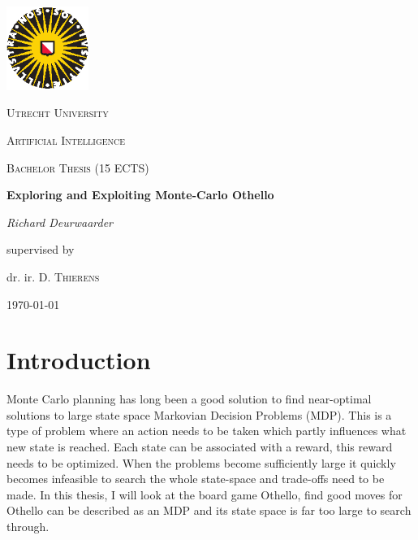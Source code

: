 \documentclass[11pt,a4paper]{article}
\begin{document}
\begin{titlepage}
	\centering
	\includegraphics[width=0.20\textwidth]{images/uu-logo}\par\vspace{1cm}
	{\scshape\LARGE Utrecht University \par}
	\vspace{0.5cm}
	{\scshape\Large Artificial Intelligence\par}
	{\scshape\Large Bachelor Thesis (15 ECTS)\par}
	\vspace{1.5cm}
	{\huge\bfseries Exploring and Exploiting Monte-Carlo Othello\par}
	\vspace{0.5cm}
	{\Large\itshape Richard Deurwaarder\par}
	\vfill
	supervised by\par
	dr. ir. D. \textsc{Thierens}
	
	\vfill
	
	{\large \today\par}
\end{titlepage}

\begin{abstract}
TODO
Monte Carlo planning has long been a good solution to find near optimal solutions to large state space Markovian Decision Problems (MDP). This is a type of problem where an action needs to be taken which partly influences what new state is reached. Each state can be associated with a reward, this reward needs to be optimized. When the problems become sufficiently large it quickly becomes infeasible to search the whole state-space and trade-offs need to be made. In this thesis I will look at the board game Othello, find good moves for Othello can be described as a MDP and its state space is far too large to search through.\\\\
\textbf{Keywords:} Bandit problems, UCT, Monte carlo tree search, Othello
\end{abstract}

\section{Introduction}
Monte Carlo planning has long been a good solution to find near-optimal solutions to large state space Markovian Decision Problems (MDP). This is a type of problem where an action needs to be taken which partly influences what new state is reached. Each state can be associated with a reward, this reward needs to be optimized. When the problems become sufficiently large it quickly becomes infeasible to search the whole state-space and trade-offs need to be made. In this thesis, I will look at the board game Othello, find good moves for Othello can be described as an MDP and its state space is far too large to search through.\\
\end{document}
